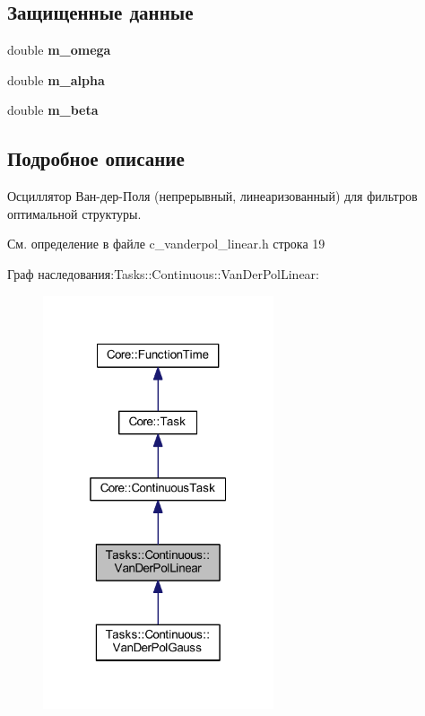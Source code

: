 \subsection*{Защищенные данные}
\begin{DoxyCompactItemize}
\item 
\hypertarget{class_tasks_1_1_continuous_1_1_van_der_pol_linear_a32bc8a8ea2d48bbee7cb368511d19bc5}{}\label{class_tasks_1_1_continuous_1_1_van_der_pol_linear_a32bc8a8ea2d48bbee7cb368511d19bc5} 
double {\bfseries m\+\_\+omega}
\item 
\hypertarget{class_tasks_1_1_continuous_1_1_van_der_pol_linear_a1054e1ea7e2459ac378fddb763077226}{}\label{class_tasks_1_1_continuous_1_1_van_der_pol_linear_a1054e1ea7e2459ac378fddb763077226} 
double {\bfseries m\+\_\+alpha}
\item 
\hypertarget{class_tasks_1_1_continuous_1_1_van_der_pol_linear_adf8894890b4e4a7d05c450ce145d69b9}{}\label{class_tasks_1_1_continuous_1_1_van_der_pol_linear_adf8894890b4e4a7d05c450ce145d69b9} 
double {\bfseries m\+\_\+beta}
\end{DoxyCompactItemize}


\subsection{Подробное описание}
Осциллятор Ван-\/дер-\/Поля (непрерывный, линеаризованный) для фильтров оптимальной структуры. 

См. определение в файле c\+\_\+vanderpol\+\_\+linear.\+h строка 19



Граф наследования\+:Tasks\+:\+:Continuous\+:\+:Van\+Der\+Pol\+Linear\+:\nopagebreak
\begin{figure}[H]
\begin{center}
\leavevmode
\includegraphics[width=193pt]{class_tasks_1_1_continuous_1_1_van_der_pol_linear__inherit__graph}
\end{center}
\end{figure}


